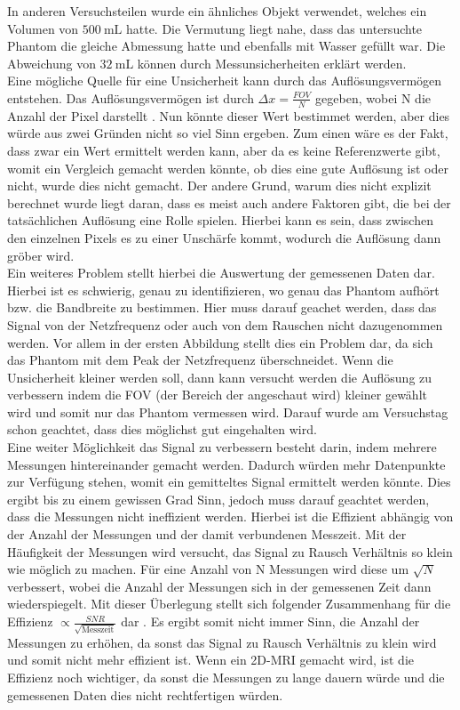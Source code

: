 In anderen Versuchsteilen wurde ein ähnliches Objekt verwendet, welches ein Volumen von $\SI{500}{\milli \liter}$ hatte. Die Vermutung liegt nahe, dass das untersuchte Phantom die gleiche Abmessung hatte und ebenfalls mit Wasser gefüllt war. Die Abweichung von $\SI{32}{\milli\liter}$ können durch Messunsicherheiten erklärt werden.\\
Eine mögliche Quelle für eine Unsicherheit kann durch das Auflösungsvermögen entstehen. Das Auflösungsvermögen ist durch $\Delta x=\frac{FOV}{N}$ gegeben, wobei N die Anzahl der Pixel darstellt \cite{Schmidt}. Nun könnte dieser Wert bestimmet werden, aber dies würde aus zwei Gründen nicht so viel Sinn ergeben. Zum einen wäre es der Fakt, dass zwar ein Wert ermittelt werden kann, aber da es keine Referenzwerte gibt, womit ein Vergleich gemacht werden könnte, ob dies eine gute Auflösung ist oder nicht, wurde dies nicht gemacht. Der andere Grund, warum dies nicht explizit berechnet wurde liegt daran, dass es meist auch andere Faktoren gibt, die bei der tatsächlichen Auflösung eine Rolle spielen. Hierbei kann es sein, dass zwischen den einzelnen Pixels es zu einer Unschärfe kommt, wodurch die Auflösung dann gröber wird.\\
Ein weiteres Problem stellt hierbei die Auswertung der gemessenen Daten dar. Hierbei ist es schwierig, genau zu identifizieren, wo genau das Phantom aufhört bzw. die Bandbreite zu bestimmen. Hier muss darauf geachet werden, dass das Signal von der Netzfrequenz oder auch von dem Rauschen nicht dazugenommen werden. Vor allem in der ersten Abbildung stellt dies ein Problem dar, da sich das Phantom mit dem Peak der Netzfrequenz überschneidet.
Wenn die Unsicherheit kleiner werden soll, dann kann versucht werden die Auflösung zu verbessern indem die FOV (der Bereich der angeschaut wird) kleiner gewählt wird und somit nur das Phantom vermessen wird. Darauf wurde am Versuchstag schon geachtet, dass dies möglichst gut eingehalten wird. \\
Eine weiter Möglichkeit das Signal zu verbessern besteht darin, indem mehrere Messungen hintereinander gemacht werden. Dadurch würden mehr Datenpunkte zur Verfügung stehen, womit ein gemitteltes Signal ermittelt werden könnte. Dies ergibt bis zu einem gewissen Grad Sinn, jedoch muss darauf geachtet werden, dass die Messungen nicht \glqq ineffizient\grqq{} werden. Hierbei ist die Effizient abhängig von der Anzahl der Messungen und der damit verbundenen Messzeit. Mit der Häufigkeit der Messungen wird versucht, das Signal zu Rausch Verhältnis so klein wie möglich zu machen. Für eine Anzahl von N Messungen wird diese um $\sqrt{N}$ verbessert, wobei die Anzahl der Messungen sich in der gemessenen Zeit dann wiederspiegelt. Mit dieser Überlegung stellt sich folgender Zusammenhang für die Effizienz $\propto\frac{SNR}{\sqrt{\text{Messzeit}}}$ dar \cite{Schmidt}. Es ergibt somit nicht immer Sinn, die Anzahl der Messungen zu erhöhen, da sonst das Signal zu Rausch Verhältnis zu klein wird und somit nicht mehr effizient ist.
Wenn ein 2D-MRI gemacht wird, ist die Effizienz noch wichtiger, da sonst die Messungen zu lange dauern würde und die gemessenen Daten dies nicht rechtfertigen würden. 